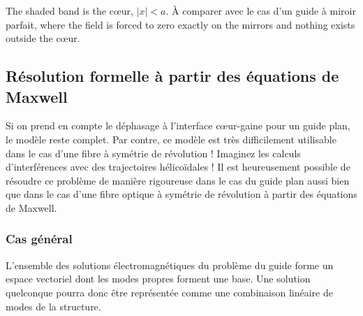 \noindent The shaded band is the cœur, $|x| < a$. À comparer avec le cas d'un
guide à miroir parfait, where the field is forced to zero exactly on the
mirrors and nothing exists outside the cœur.

\subsection{Résolution formelle à partir des équations de Maxwell}

Si on prend en compte le déphasage à l'interface cœur-gaine pour un guide plan,
le modèle reste complet. Par contre, ce modèle est très difficilement
utilisable dans le cas d'une fibre à symétrie de révolution ! Imaginez les
calculs d'interférences avec des trajectoires hélicoïdales ! Il est
heureusement possible de résoudre ce problème de manière rigoureuse dans le cas
du guide plan aussi bien que dans le cas d'une fibre optique à symétrie de
révolution à partir des équations de Maxwell.

\subsubsection{Cas général}
\begin{postulate}
  L'ensemble des solutions électromagnétiques du problème du guide forme un
  espace vectoriel dont les modes propres forment une base. Une solution
  quelconque pourra donc être représentée comme une combinaison linéaire de
  modes de la structure.
\end{postulate}

